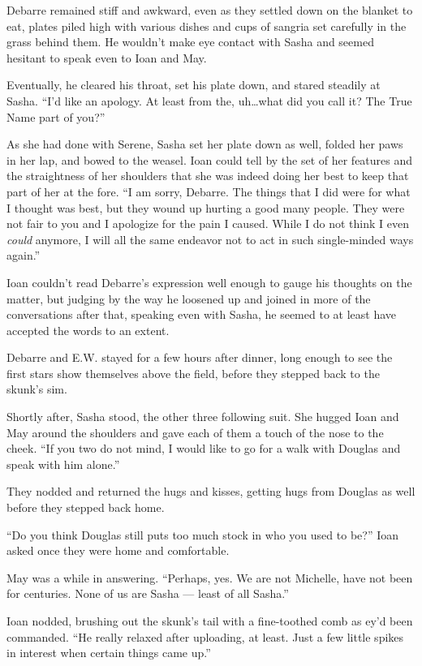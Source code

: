 Debarre remained stiff and awkward, even as they settled down on the blanket to eat, plates piled high with various dishes and cups of sangria set carefully in the grass behind them. He wouldn't make eye contact with Sasha and seemed hesitant to speak even to Ioan and May.

Eventually, he cleared his throat, set his plate down, and stared steadily at Sasha. ``I'd like an apology. At least from the, uh\ldots what did you call it? The True Name part of you?''

As she had done with Serene, Sasha set her plate down as well, folded her paws in her lap, and bowed to the weasel. Ioan could tell by the set of her features and the straightness of her shoulders that she was indeed doing her best to keep that part of her at the fore. ``I am sorry, Debarre. The things that I did were for what I thought was best, but they wound up hurting a good many people. They were not fair to you and I apologize for the pain I caused. While I do not think I even \emph{could} anymore, I will all the same endeavor not to act in such single-minded ways again.''

Ioan couldn't read Debarre's expression well enough to gauge his thoughts on the matter, but judging by the way he loosened up and joined in more of the conversations after that, speaking even with Sasha, he seemed to at least have accepted the words to an extent.

Debarre and E.W. stayed for a few hours after dinner, long enough to see the first stars show themselves above the field, before they stepped back to the skunk's sim.

Shortly after, Sasha stood, the other three following suit. She hugged Ioan and May around the shoulders and gave each of them a touch of the nose to the cheek. ``If you two do not mind, I would like to go for a walk with Douglas and speak with him alone.''

They nodded and returned the hugs and kisses, getting hugs from Douglas as well before they stepped back home.

``Do you think Douglas still puts too much stock in who you used to be?'' Ioan asked once they were home and comfortable.

May was a while in answering. ``Perhaps, yes. We are not Michelle, have not been for centuries. None of us are Sasha — least of all Sasha.''

Ioan nodded, brushing out the skunk's tail with a fine-toothed comb as ey'd been commanded. ``He really relaxed after uploading, at least. Just a few little spikes in interest when certain things came up.''

